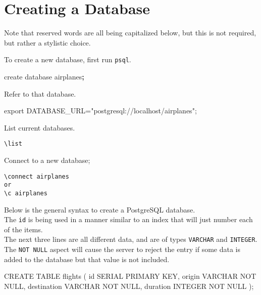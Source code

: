 \documentclass[]{book}
\newenvironment{Shaded}{\begin{snugshade}}{\end{snugshade}}
\newcommand{\KeywordTok}[1]{\textcolor[rgb]{0.13,0.29,0.53}{\textbf{#1}}}
\newcommand{\StringTok}[1]{\textcolor[rgb]{0.31,0.60,0.02}{#1}}
\newcommand{\FunctionTok}[1]{\textcolor[rgb]{0.00,0.00,0.00}{#1}}
\newcommand{\VariableTok}[1]{\textcolor[rgb]{0.00,0.00,0.00}{#1}}
\newcommand{\BuiltInTok}[1]{#1}
\newcommand{\ExtensionTok}[1]{#1}
\newcommand{\NormalTok}[1]{#1}
\begin{document}
\section{Creating a Database}\label{creating-a-database}

Note that reserved words are all being capitalized below, but this is
not required, but rather a stylistic choice.

To create a new database, first run \texttt{psql}.

\begin{Shaded}
\begin{Highlighting}[]
\ExtensionTok{create}\NormalTok{ database airplanes}\KeywordTok{;}
\end{Highlighting}
\end{Shaded}

Refer to that database.

\begin{Shaded}
\begin{Highlighting}[]
\BuiltInTok{export} \VariableTok{DATABASE_URL=}\StringTok{"postgresql://localhost/airplanes"}\NormalTok{;}
\end{Highlighting}
\end{Shaded}

List current databases.

\begin{verbatim}
\list
\end{verbatim}

Connect to a new database;

\begin{verbatim}
\connect airplanes
or
\c airplanes
\end{verbatim}

Below is the general syntax to create a PostgreSQL database.\\
The \texttt{id} is being used in a manner similar to an index that will
just number each of the items.\\
The next three lines are all different data, and are of types
\texttt{VARCHAR} and \texttt{INTEGER}.\\
The \texttt{NOT\ NULL} aspect will cause the server to reject the entry
if some data is added to the database but that value is not included.

\begin{Shaded}
\begin{Highlighting}[]
\ExtensionTok{CREATE}\NormalTok{ TABLE flights (           }
    \FunctionTok{id}\NormalTok{ SERIAL PRIMARY KEY,       }
    \ExtensionTok{origin}\NormalTok{ VARCHAR NOT NULL,     }
    \ExtensionTok{destination}\NormalTok{ VARCHAR NOT NULL,}
    \ExtensionTok{duration}\NormalTok{ INTEGER NOT NULL    }
\NormalTok{);                               }
\end{Highlighting}
\end{Shaded}
\end{document}
